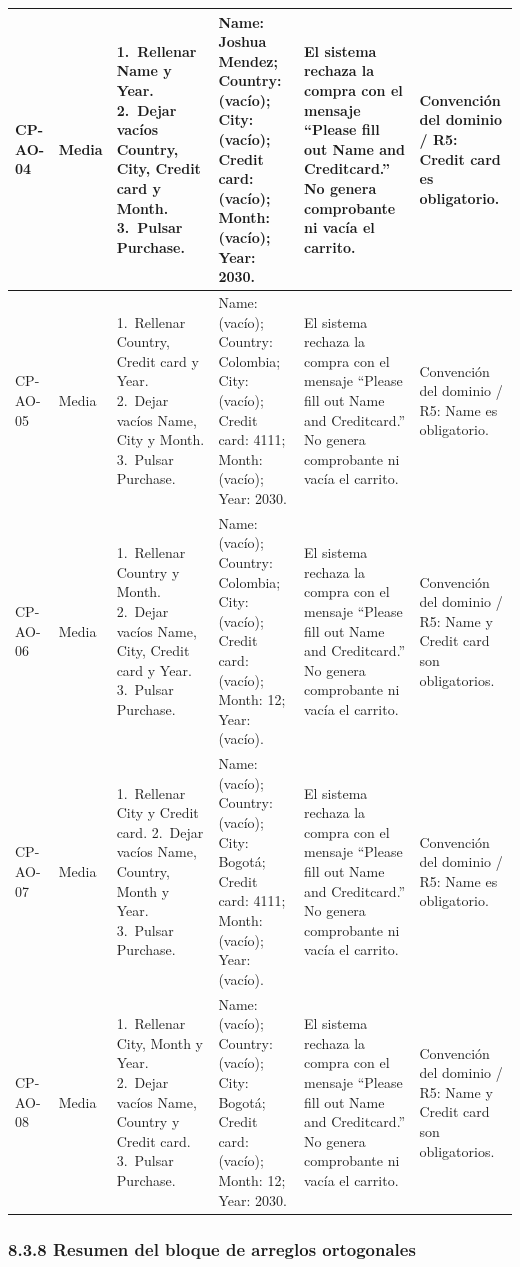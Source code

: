 \begin{longtable}{@{}L{1.5cm} L{1.0cm} L{3.1cm} L{2.8cm} L{3.4cm} L{2.8cm}@{}}
\midrule
CP-AO-04 & Media & 1.~Rellenar Name y Year. 2.~Dejar vacíos Country, City, Credit card y Month. 3.~Pulsar Purchase. & Name: Joshua Mendez; Country: (vacío); City: (vacío); Credit card: (vacío); Month: (vacío); Year: 2030. & El sistema rechaza la compra con el mensaje ``Please fill out Name and Creditcard.'' No genera comprobante ni vacía el carrito. & Convención del dominio / R5: Credit card es obligatorio. \\
\midrule
CP-AO-05 & Media & 1.~Rellenar Country, Credit card y Year. 2.~Dejar vacíos Name, City y Month. 3.~Pulsar Purchase. & Name: (vacío); Country: Colombia; City: (vacío); Credit card: 4111; Month: (vacío); Year: 2030. & El sistema rechaza la compra con el mensaje ``Please fill out Name and Creditcard.'' No genera comprobante ni vacía el carrito. & Convención del dominio / R5: Name es obligatorio. \\
\midrule
CP-AO-06 & Media & 1.~Rellenar Country y Month. 2.~Dejar vacíos Name, City, Credit card y Year. 3.~Pulsar Purchase. & Name: (vacío); Country: Colombia; City: (vacío); Credit card: (vacío); Month: 12; Year: (vacío). & El sistema rechaza la compra con el mensaje ``Please fill out Name and Creditcard.'' No genera comprobante ni vacía el carrito. & Convención del dominio / R5: Name y Credit card son obligatorios. \\
\midrule
CP-AO-07 & Media & 1.~Rellenar City y Credit card. 2.~Dejar vacíos Name, Country, Month y Year. 3.~Pulsar Purchase. & Name: (vacío); Country: (vacío); City: Bogotá; Credit card: 4111; Month: (vacío); Year: (vacío). & El sistema rechaza la compra con el mensaje ``Please fill out Name and Creditcard.'' No genera comprobante ni vacía el carrito. & Convención del dominio / R5: Name es obligatorio. \\
\midrule
CP-AO-08 & Media & 1.~Rellenar City, Month y Year. 2.~Dejar vacíos Name, Country y Credit card. 3.~Pulsar Purchase. & Name: (vacío); Country: (vacío); City: Bogotá; Credit card: (vacío); Month: 12; Year: 2030. & El sistema rechaza la compra con el mensaje ``Please fill out Name and Creditcard.'' No genera comprobante ni vacía el carrito. & Convención del dominio / R5: Name y Credit card son obligatorios. \\
\end{longtable}
\endgroup

\subsubsection*{8.3.8 Resumen del bloque de arreglos ortogonales}

